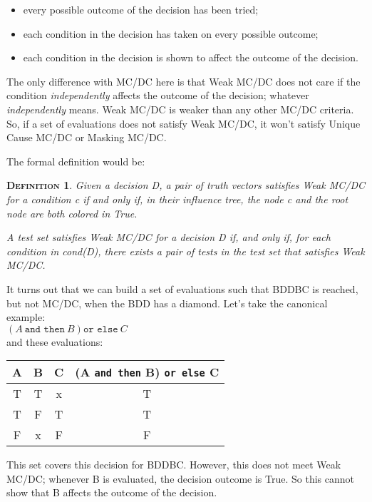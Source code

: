 \documentclass[a4paper,12pt,twoside]{article}
\newcommand{\andthen}{\texttt{and then}}
\newcommand{\orelse}{\texttt{or else}}
\newtheorem{definition}{\textsc{Definition}}
\begin{document}
\begin{itemize}
\item every possible outcome of the decision has been tried;
\item each condition in the decision has taken on every possible outcome;
\item each condition in the decision is shown to affect the outcome of the
      decision.
\end{itemize}

The only difference with MC/DC here is that Weak MC/DC does not care
if the condition \textit{independently} affects the outcome of the decision;
whatever \textit{independently} means. Weak MC/DC is weaker than any other
MC/DC criteria. So, if a set of evaluations does not satisfy Weak MC/DC,
it won't satisfy Unique Cause MC/DC or Masking MC/DC.

The formal definition would be:

\begin{definition}
  \label{def:weak-mcdc}
  Given a decision D, a pair of truth vectors satisfies Weak MC/DC for
  a condition c if and only if, in their influence tree, the node c
  and the root node are both colored in True.

  A test set satisfies Weak MC/DC for a decision D if, and only if,
  for each condition in cond(D), there exists a pair of tests in the
  test set that satisfies Weak MC/DC.
\end{definition}

It turns out that we can build a set of evaluations such that BDDBC is
reached, but not MC/DC, when the BDD has a diamond.  Let's take the
canonical example:\\
$(A \ \andthen{} \ B) \orelse{} \ C$\\
and these evaluations:

\begin{center}
\begin{tabular}{|c|c|c||c|}
\hline
A & B & C & (A \andthen{} B) \orelse{} C \\ \hline
T & T & x & T \\ \hline
T & F & T & T \\ \hline
F & x & F & F \\ \hline
\end{tabular}
\end{center}

This set covers this decision for BDDBC. However, this does not meet
Weak MC/DC; whenever B is evaluated, the decision outcome is True. So
this cannot show that B affects the outcome of the decision.
\end{document}
